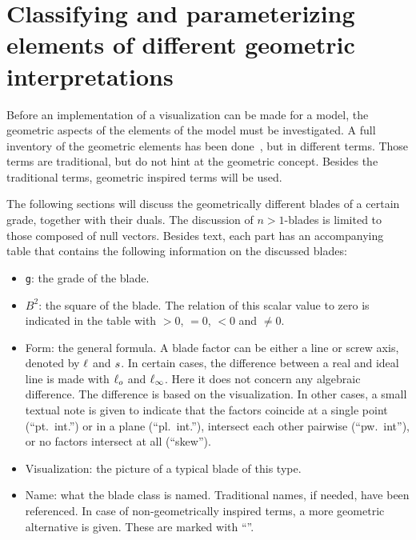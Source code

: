 \section{Classifying and parameterizing elements of different geometric interpretations}
\label{ch:research}

Before an implementation of a visualization can be made for a model, the geometric aspects of the elements of the model must be investigated.  A full inventory of the geometric elements has been done~\cite[Chapter 3]{Pottmann}, but in different terms.  Those terms are traditional, but do not hint at the geometric concept.  Besides the traditional terms, geometric inspired terms will be used.  

The following sections will discuss the geometrically different blades of a certain grade, together with their duals.  The discussion of $n>1$-blades is limited to those composed of null vectors.  Besides text, each part has an accompanying table that contains the following information on the discussed blades:
\begin{itemize}
  \item \texttt{g}: the grade of the blade.
  \item $B^2$: the square of the blade.  The relation of this scalar value to zero is indicated in the table with $> 0$, $= 0$, $< 0$ and $\not= 0$.
  \item Form: the general formula.  A blade factor can be either a line or screw axis, denoted by $\ell$ and $s$.  In certain cases, the difference between a real and ideal line is made with $\ell_o$ and $\ell_\infty$.  Here it does not concern any algebraic difference.  The difference is based on the visualization.  In other cases, a small textual note is given to indicate that the factors coincide at a single point (``pt.\ int.'') or in a plane (``pl.\ int.''), intersect each other pairwise (``pw.\ int''), or no factors intersect at all (``skew'').
  \item Visualization: the picture of a typical blade of this type.
  \item Name: what the blade class is named.  Traditional names, if needed, have been referenced.  In case of non-geometrically inspired terms, a more geometric alternative is given.  These are marked with ``\newterm''.
    
\end{itemize}


